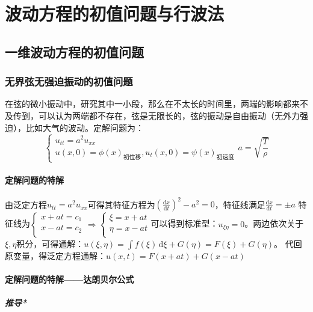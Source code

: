 \chapter{波动方程的初值问题与行波法}
 
\section{一维波动方程的初值问题}

\subsection{无界弦无强迫振动的初值问题}

在弦的微小振动中，研究其中一小段，那么在不太长的时间里，两端的影响都来不及传到，可以认为两端都不存在，弦是无限长的，弦的振动是自由振动（无外力强迫），比如大气的波动。定解问题为：
\[
\begin{cases}
	u_{tt}=a^2u_{xx}\\
	u(x,0)=\phi(x)_\text{初位移},u_t(x,0)=\psi(x)_\text{初速度}
\end{cases}
a=\sqrt{\frac{T}{\rho}}
\]

\subsubsection{定解问题的特解}

由泛定方程\(u_{tt}=a^2u_{xx}\)可得其特征方程为\(\left(\frac{\mathrm{d}x}{\mathrm{d}t}\right)^2-a^2=0\)，特征线满足\(\frac{\mathrm{d}x}{\mathrm{d}t}=\pm a\)	特征线为\(\begin{cases}x+at=c_1\\x-at=c_2\\\end{cases}\Rightarrow\begin{cases}\xi=x+at\\\eta=x-at\\\end{cases}\)可以得到标准型：\(u_{\xi\eta}=0\)。两边依次关于\(\xi,\eta\)积分，可得通解：\(u(\xi,\eta)=\int f(\xi)\,\mathrm{d}\xi+G(\eta)=F(\xi)+G(\eta)\)。	代回原变量，得泛定方程通解：\(u(x,t)=F(x+at)+G(x-at)\)

\subsubsection{定解问题的特解——达朗贝尔公式}

\paragraph{推导*}

